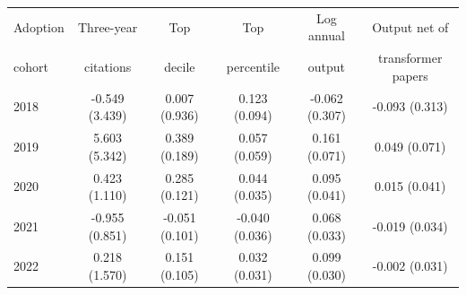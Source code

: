 \begin{tabular}{lccccc}
\toprule
Adoption & Three-year & Top & Top & Log annual & Output net of \\
cohort & citations & decile & percentile & output & transformer papers \\
\midrule
2018 & -0.549 (3.439) & 0.007 (0.936) & 0.123 (0.094) & -0.062 (0.307) & -0.093 (0.313) \\
2019 & 5.603 (5.342) & 0.389 (0.189) & 0.057 (0.059) & 0.161 (0.071) & 0.049 (0.071) \\
2020 & 0.423 (1.110) & 0.285 (0.121) & 0.044 (0.035) & 0.095 (0.041) & 0.015 (0.041) \\
2021 & -0.955 (0.851) & -0.051 (0.101) & -0.040 (0.036) & 0.068 (0.033) & -0.019 (0.034) \\
2022 & 0.218 (1.570) & 0.151 (0.105) & 0.032 (0.031) & 0.099 (0.030) & -0.002 (0.031) \\
\bottomrule
\end{tabular}
